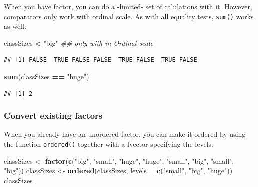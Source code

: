 \documentclass[]{book}
\newenvironment{Shaded}{\begin{snugshade}}{\end{snugshade}}
\newcommand{\CommentTok}[1]{\textcolor[rgb]{0.56,0.35,0.01}{\textit{#1}}}
\newcommand{\DataTypeTok}[1]{\textcolor[rgb]{0.13,0.29,0.53}{#1}}
\newcommand{\KeywordTok}[1]{\textcolor[rgb]{0.13,0.29,0.53}{\textbf{#1}}}
\newcommand{\NormalTok}[1]{#1}
\newcommand{\OperatorTok}[1]{\textcolor[rgb]{0.81,0.36,0.00}{\textbf{#1}}}
\newcommand{\StringTok}[1]{\textcolor[rgb]{0.31,0.60,0.02}{#1}}
\begin{document}
When you have factor, you can do a -limited- set of calulations with it. However, comparators only work with ordinal scale. As with all equality tests, \texttt{sum()} works as well:

\begin{Shaded}
\begin{Highlighting}[]
\NormalTok{classSizes }\OperatorTok{<}\StringTok{ "big"} \CommentTok{## only with in Ordinal scale}
\end{Highlighting}
\end{Shaded}

\begin{verbatim}
## [1] FALSE  TRUE FALSE FALSE  TRUE FALSE  TRUE FALSE
\end{verbatim}

\begin{Shaded}
\begin{Highlighting}[]
\KeywordTok{sum}\NormalTok{(classSizes }\OperatorTok{==}\StringTok{ "huge"}\NormalTok{) }
\end{Highlighting}
\end{Shaded}

\begin{verbatim}
## [1] 2
\end{verbatim}

\hypertarget{convert-existing-factors}{%
\subsubsection*{Convert existing factors}\label{convert-existing-factors}}

When you already have an unordered factor, you can make it ordered by using the function \texttt{ordered()} together with a fvector specifying the levels.

\begin{Shaded}
\begin{Highlighting}[]
\NormalTok{classSizes <-}\StringTok{ }\KeywordTok{factor}\NormalTok{(}\KeywordTok{c}\NormalTok{(}\StringTok{"big"}\NormalTok{, }\StringTok{"small"}\NormalTok{, }\StringTok{"huge"}\NormalTok{, }\StringTok{"huge"}\NormalTok{,}
    \StringTok{"small"}\NormalTok{, }\StringTok{"big"}\NormalTok{, }\StringTok{"small"}\NormalTok{, }\StringTok{"big"}\NormalTok{))}
\NormalTok{classSizes <-}\StringTok{ }\KeywordTok{ordered}\NormalTok{(classSizes,}
                    \DataTypeTok{levels =} \KeywordTok{c}\NormalTok{(}\StringTok{"small"}\NormalTok{, }\StringTok{"big"}\NormalTok{, }\StringTok{"huge"}\NormalTok{))}
\NormalTok{classSizes}
\end{Highlighting}
\end{Shaded}
\end{document}
